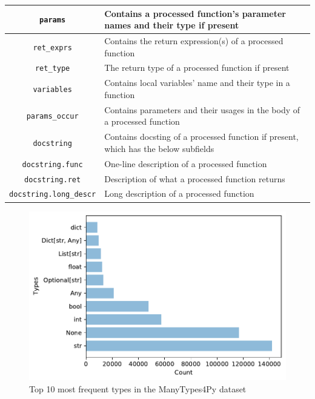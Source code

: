 \documentclass[10pt, conference]{IEEEtran}
\begin{document}
\begin{table}[t]
\begin{tabular}{c l}
		\midrule
		\texttt{params} & Contains a processed function's parameter names and their type if present \\
		\midrule
		\texttt{ret\_exprs} & Contains the return expression(s) of a processed function \\
		\midrule
		\texttt{ret\_type} & The return type of a processed function if present \\
		\midrule
		\texttt{variables} & Contains local variables' name and their type in a function \\
		\midrule
		\texttt{params\_occur} & Contains parameters and their usages in the body of a processed function \\
		\midrule
		\texttt{docstring} & Contains docsting of a processed function if present, which has the below subfields \\
		\midrule
		\texttt{docstring.func} & One-line description of a processed function \\
		\midrule
		\texttt{docstring.ret} & Description of what a processed function returns \\
		\midrule
		\texttt{docstring.long\_descr} & Long description of a processed function \\
		\bottomrule
	\end{tabular}
\end{table}




\begin{figure}
	\centering
	\includegraphics[width=\linewidth]{figs/top-10-most-frequent-types.pdf}
	\caption{Top 10 most frequent types in the ManyTypes4Py dataset}
	\label{fig:top-10-types}
\end{figure}
\end{document}
